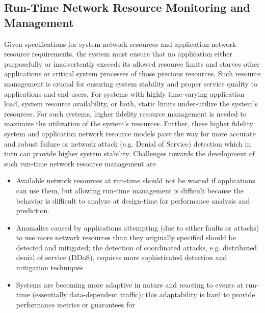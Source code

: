 \subsection{Run-Time Network Resource Monitoring and Management}
Given specifications for system network resources and application
network resource requirements, the system must ensure that no
application either purposefully or inadvertently exceeds its allowed
resource limits and starves other applications or critical system
processes of those precious resources.  Such resource management is
crucial for ensuring system stability and proper service quality to
applications and end-users.  For systems with highly time-varying
application load, system resource availability, or both, static limits
under-utilize the system's resources.  For such systems, higher
fidelity resource management is needed to maximize the utilization of
the system's resources.  Further, these higher fidelity system and
application network resource models pave the way for more accurate and
robust failure or network attack (e.g. Denial of Service) detection
which in turn can provide higher system stability.  Challenges towards
the development of such run-time network resource management are
\begin{itemize}
\item Available network resources at run-time should not be wasted if
  applications can use them, but allowing run-time management is
  difficult because the behavior is difficult to analyze at
  design-time for performance analysis and prediction.
\item Anomalies caused by applications attempting (due to either
  faults or attacks) to use more network resources than they
  originally specified should be detected and mitigated; the detection
  of coordinated attacks, e.g. distributed denial of service (DDoS),
  requires more sophisticated detection and mitigation techniques
\item Systems are becoming more adaptive in nature and reacting to
  events at run-time (essentially data-dependent traffic); this
  adaptability is hard to provide performance metrics or guarantees
  for
\end{itemize}

